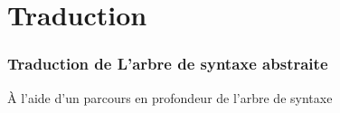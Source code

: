 \section{Traduction}

\begin{frame}
    
\end{frame}

\begin{frame}
    \frametitle{Traduction de L'arbre de syntaxe abstraite\esp}
    \begin{center}
        
    \end{center}
    \vspace{0.5cm}
    À l'aide d'un parcours en profondeur de l'arbre de syntaxe


\end{frame}

